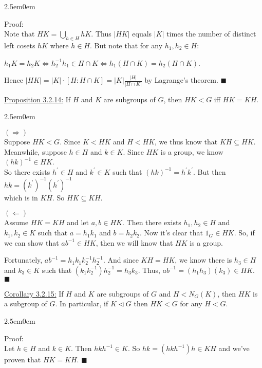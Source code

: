 \documentclass{book}
\newcommand{\exThreeP}{%
   \color{RedViolet}%
   \fontsize{12}{14}\selectfont%
}
\newenvironment{myIndent}{%
   \begin{adjustwidth}{2.5em}{0em}%
}{%
   \end{adjustwidth}%
}
\newcommand{\retTwo}{\hfill\bigbreak}
\begin{document}
\begin{myIndent}\exThreeP
	Proof:\\
	Note that $HK = \bigcup_{h \in H} hK$. Thus $|HK|$ equals $|K|$ times the number of distinct left cosets $hK$ where $h \in H$. But note that for any $h_1, h_2 \in H$:
	
	{\centering$h_1 K = h_2 K \Longleftrightarrow h_2^{-1}h_1 \in H \cap K \Longleftrightarrow h_1 (H \cap K) = h_2 (H \cap K)$.\newpage\par}

	Hence $|HK| = |K| \cdot [H : H \cap K] = |K|\frac{|H|}{|H \cap K|}$ by Lagrange's theorem. $\blacksquare$\retTwo
\end{myIndent}

\ul{Proposition 3.2.14:} If $H$ and $K$ are subgroups of $G$, then $HK < G$ iff $HK = KH$.

\begin{myIndent}\exThreeP
	$(\Longrightarrow)$\\
	Suppose $HK < G$. Since $K < HK$ and $H < HK$, we thus know that $KH \subseteq HK$.\\ Meanwhile, suppose $h \in H$ and $k \in K$. Since $HK$ is a group, we know $(hk)^{-1} \in HK$.\\ So there exists $h^\prime \in H$ and $k^\prime \in K$ such that $(hk)^{-1} = h^\prime k^\prime$. But then $hk = (k^\prime)^{-1}(h^\prime)^{-1}$\\ which is in $KH$. So $HK \subseteq KH$.\retTwo

	$(\Longleftarrow)$\\
	Assume $HK = KH$ and let $a, b \in HK$. Then there exists $h_1, h_2 \in H$ and $k_1, k_2 \in K$ such that $a = h_1k_1$ and $b = h_2k_2$. Now it's clear that $1_G \in HK$. So, if we can show that $ab^{-1} \in HK$, then we will know that $HK$ is a group.\retTwo
	
	Fortunately, $ab^{-1} = h_1k_1k_2^{-1}h_2^{-1}$. And since $KH = HK$, we know there is $h_3 \in H$ and $k_3 \in K$ such that $(k_1k_2^{-1})h_2^{-1} = h_3 k_3$. Thus, $ab^{-1} = (h_1h_3)(k_3) \in HK$. $\blacksquare$\retTwo
\end{myIndent}

\ul{Corollary 3.2.15:} If $H$ and $K$ are subgroups of $G$ and $H < N_G(K)$, then $HK$ is a subgroup of $G$. In particular, if $K \lhd G$ then $HK < G$ for any $H < G$.

\begin{myIndent}\exThreeP
	Proof:\\
	Let $h \in H$ and $k \in K$. Then $hkh^{-1} \in K$. So $hk = (hkh^{-1})h \in KH$ and we've proven that $HK = KH$. $\blacksquare$\retTwo
\end{myIndent}
\end{document}
